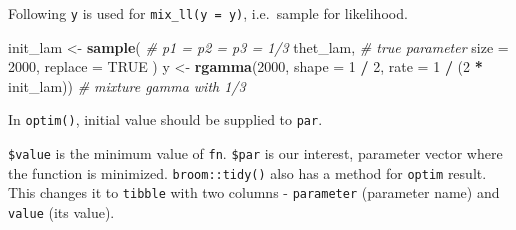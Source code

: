 \documentclass[]{book}
\newenvironment{Shaded}{\begin{snugshade}}{\end{snugshade}}
\newcommand{\CommentTok}[1]{\textcolor[rgb]{0.56,0.35,0.01}{\textit{#1}}}
\newcommand{\DataTypeTok}[1]{\textcolor[rgb]{0.13,0.29,0.53}{#1}}
\newcommand{\DecValTok}[1]{\textcolor[rgb]{0.00,0.00,0.81}{#1}}
\newcommand{\FloatTok}[1]{\textcolor[rgb]{0.00,0.00,0.81}{#1}}
\newcommand{\KeywordTok}[1]{\textcolor[rgb]{0.13,0.29,0.53}{\textbf{#1}}}
\newcommand{\NormalTok}[1]{#1}
\newcommand{\OperatorTok}[1]{\textcolor[rgb]{0.81,0.36,0.00}{\textbf{#1}}}
\newcommand{\OtherTok}[1]{\textcolor[rgb]{0.56,0.35,0.01}{#1}}
\newcommand{\StringTok}[1]{\textcolor[rgb]{0.31,0.60,0.02}{#1}}
\theoremstyle{definition}
\theoremstyle{definition}
\theoremstyle{definition}
\theoremstyle{remark}
\begin{document}
Following \texttt{y} is used for \texttt{mix\_ll(y\ =\ y)}, i.e.~sample for likelihood.

\begin{Shaded}
\begin{Highlighting}[]
\NormalTok{init_lam <-}\StringTok{ }
\StringTok{  }\KeywordTok{sample}\NormalTok{( }\CommentTok{# p1 = p2 = p3 = 1/3}
\NormalTok{    thet_lam, }\CommentTok{# true parameter}
    \DataTypeTok{size =} \DecValTok{2000}\NormalTok{,}
    \DataTypeTok{replace =} \OtherTok{TRUE}
\NormalTok{  )}
\NormalTok{y <-}\StringTok{ }\KeywordTok{rgamma}\NormalTok{(}\DecValTok{2000}\NormalTok{, }\DataTypeTok{shape =} \DecValTok{1} \OperatorTok{/}\StringTok{ }\DecValTok{2}\NormalTok{, }\DataTypeTok{rate =}  \DecValTok{1} \OperatorTok{/}\StringTok{ }\NormalTok{(}\DecValTok{2} \OperatorTok{*}\StringTok{ }\NormalTok{init_lam)) }\CommentTok{# mixture gamma with 1/3}
\end{Highlighting}
\end{Shaded}

In \texttt{optim()}, initial value should be supplied to \texttt{par}.

\begin{Shaded}
\end{Shaded}

\texttt{\$value} is the minimum value of \texttt{fn}. \texttt{\$par} is our interest, parameter vector where the function is minimized. \texttt{broom::tidy()} also has a method for \texttt{optim} result. This changes it to \texttt{tibble} with two columns - \texttt{parameter} (parameter name) and \texttt{value} (its value).
\end{document}
